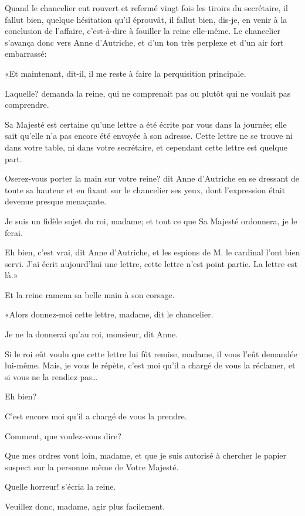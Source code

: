 Quand le chancelier eut rouvert et refermé vingt fois les tiroirs du secrétaire, il fallut bien, quelque hésitation qu'il éprouvât, il fallut bien, dis-je, en venir à la conclusion de l'affaire, c'est-à-dire à fouiller la reine elle-même. Le chancelier s'avança donc vers Anne d'Autriche, et d'un ton très perplexe et d'un air fort embarrassé: 

«Et maintenant, dit-il, il me reste à faire la perquisition principale. 

\speak  Laquelle? demanda la reine, qui ne comprenait pas ou plutôt qui ne voulait pas comprendre. 

\speak  Sa Majesté est certaine qu'une lettre a été écrite par vous dans la journée; elle sait qu'elle n'a pas encore été envoyée à son adresse. Cette lettre ne se trouve ni dans votre table, ni dans votre secrétaire, et cependant cette lettre est quelque part. 

\speak  Oserez-vous porter la main sur votre reine? dit Anne d'Autriche en se dressant de toute sa hauteur et en fixant sur le chancelier ses yeux, dont l'expression était devenue presque menaçante. 

\speak  Je suis un fidèle sujet du roi, madame; et tout ce que Sa Majesté ordonnera, je le ferai. 

\speak  Eh bien, c'est vrai, dit Anne d'Autriche, et les espions de M. le cardinal l'ont bien servi. J'ai écrit aujourd'hui une lettre, cette lettre n'est point partie. La lettre est là.» 

Et la reine ramena sa belle main à son corsage. 

«Alors donnez-moi cette lettre, madame, dit le chancelier. 

\speak  Je ne la donnerai qu'au roi, monsieur, dit Anne. 

\speak  Si le roi eût voulu que cette lettre lui fût remise, madame, il vous l'eût demandée lui-même. Mais, je vous le répète, c'est moi qu'il a chargé de vous la réclamer, et si vous ne la rendiez pas\dots 

\speak  Eh bien? 

\speak  C'est encore moi qu'il a chargé de vous la prendre. 

\speak  Comment, que voulez-vous dire? 

\speak  Que mes ordres vont loin, madame, et que je suis autorisé à chercher le papier suspect sur la personne même de Votre Majesté. 

\speak  Quelle horreur! s'écria la reine. 

\speak  Veuillez donc, madame, agir plus facilement. 

